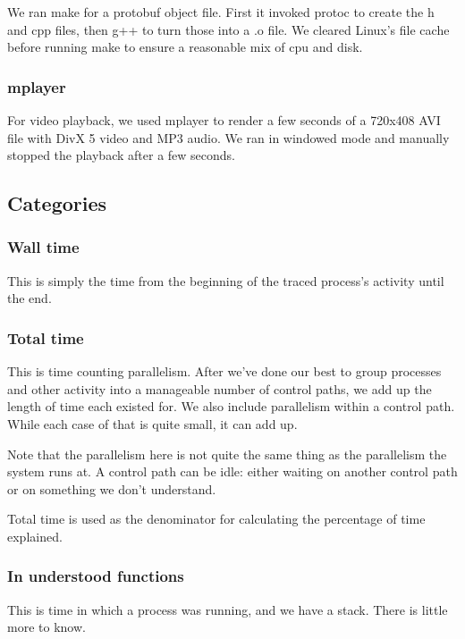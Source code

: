 \documentclass[10pt]{article}
\begin{document}
We ran make for a protobuf object file.  First it invoked protoc to create the h and cpp files, then g++ to turn those into a .o file.  We cleared Linux's file cache before running make to ensure a reasonable mix of cpu and disk.

\subsubsection{mplayer}

For video playback, we used mplayer to render a few seconds of a 720x408 AVI file with DivX 5 video and MP3 audio.  We ran in windowed mode and manually stopped the playback after a few seconds.

\subsection{Categories}

\subsubsection{Wall time}

This is simply the time from the beginning of the traced process's activity until the end.

\subsubsection{Total time}

This is time counting parallelism.  After we've done our best to group processes and other activity into a manageable number of control paths, we add up the length of time each existed for.  We also include parallelism within a control path.  While each case of that is quite small, it can add up.

Note that the parallelism here is not quite the same thing as the parallelism the system runs at.  A control path can be idle: either waiting on another control path or on something we don't understand.

Total time is used as the denominator for calculating the percentage of time explained.

\subsubsection{In understood functions}

This is time in which a process was running, and we have a stack.  There is little more to know.
\end{document}
